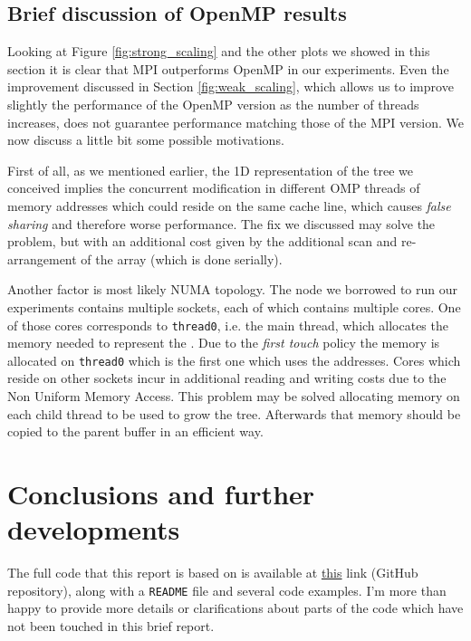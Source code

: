 \documentclass{article}
\begin{document}
\subsection{Brief discussion of OpenMP results}
Looking at Figure \ref{fig:strong_scaling} and the other plots we showed in this
section it is clear that MPI outperforms OpenMP in our experiments. Even the
improvement discussed in Section \ref{fig:weak_scaling}, which allows us to
improve slightly the performance of the OpenMP version as the number of threads
increases, does not guarantee performance matching those of the MPI version. We
now discuss a little bit some possible motivations.

First of all, as we mentioned earlier, the 1D representation of the tree we
conceived implies the concurrent modification in different OMP threads of
memory addresses which could reside on the same cache line, which causes
\emph{false sharing} and therefore worse performance. The fix we discussed
may solve the problem, but with an additional cost given by the additional scan
and re-arrangement of the array (which is done serially).

Another factor is most likely NUMA topology. The node we borrowed to run our
experiments contains multiple sockets, each of which contains multiple cores.
One of those cores corresponds to \texttt{thread0}, i.e. the main thread, which
allocates the memory needed to represent the \kdtree{}. Due to the
\emph{first touch} policy the memory is allocated on \texttt{thread0} which is
the first one which uses the addresses. Cores which reside on other sockets
incur in additional reading and writing costs due to the Non Uniform Memory
Access. This problem may be solved allocating memory on each child thread to be
used to grow the tree. Afterwards that memory should be copied to the parent
buffer in an efficient way.

\section{Conclusions and further developments}
The full code that this report is based on is available at
\href{https://github.com/fAndreuzzi/parallel-kd-tree}{this} link (GitHub
repository), along with a \texttt{README} file and several code examples. I'm
more than happy to provide more details or clarifications about parts of the
code which have not been touched in this brief report.
\end{document}
